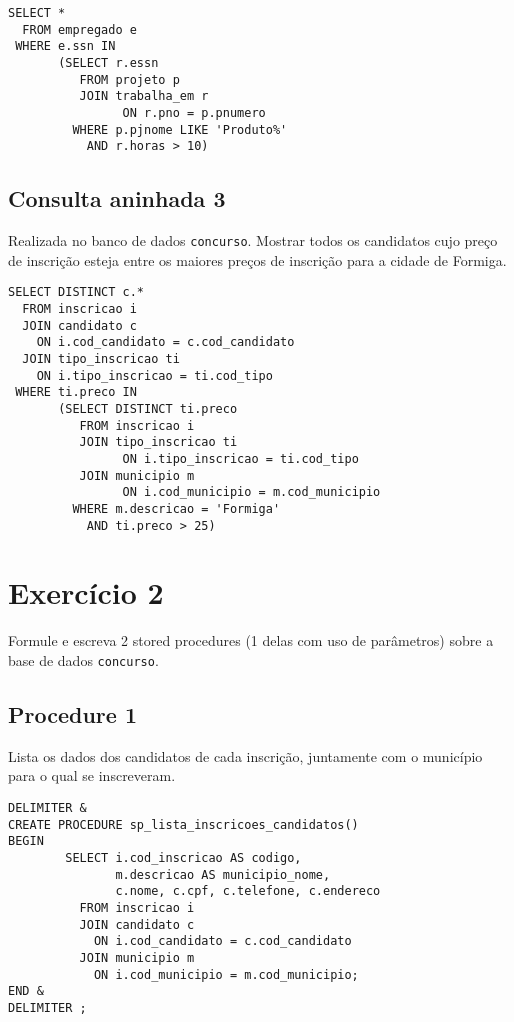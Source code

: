 \documentclass[article, a4paper, oneside, 11pt, english, brazil, sumario=tradicional]{abntex2}
\begin{document}
\begin{verbatim}
SELECT *
  FROM empregado e
 WHERE e.ssn IN
       (SELECT r.essn
          FROM projeto p
          JOIN trabalha_em r
                ON r.pno = p.pnumero
         WHERE p.pjnome LIKE 'Produto%'
           AND r.horas > 10)
\end{verbatim}

\subsection{Consulta aninhada 3}
\label{sec:org8d45d48}

Realizada no banco de dados \texttt{concurso}.
Mostrar todos  os candidatos  cujo preço  de inscrição  esteja entre  os maiores
preços de inscrição para a cidade de Formiga.

\begin{verbatim}
SELECT DISTINCT c.*
  FROM inscricao i
  JOIN candidato c
    ON i.cod_candidato = c.cod_candidato
  JOIN tipo_inscricao ti
    ON i.tipo_inscricao = ti.cod_tipo
 WHERE ti.preco IN
       (SELECT DISTINCT ti.preco
          FROM inscricao i
          JOIN tipo_inscricao ti
                ON i.tipo_inscricao = ti.cod_tipo
          JOIN municipio m
                ON i.cod_municipio = m.cod_municipio
         WHERE m.descricao = 'Formiga'
           AND ti.preco > 25)
\end{verbatim}

\section{Exercício 2}
\label{sec:orga85da9e}

Formule e escreva  2 stored procedures (1  delas com uso de  parâmetros) sobre a
base de dados \texttt{concurso}.

\subsection{Procedure 1}
\label{sec:org0bff792}

Lista os dados dos candidatos de cada inscrição, juntamente com o município para
o qual se inscreveram.

\begin{verbatim}
DELIMITER &
CREATE PROCEDURE sp_lista_inscricoes_candidatos()
BEGIN
        SELECT i.cod_inscricao AS codigo,
               m.descricao AS municipio_nome,
               c.nome, c.cpf, c.telefone, c.endereco
          FROM inscricao i
          JOIN candidato c
            ON i.cod_candidato = c.cod_candidato
          JOIN municipio m
            ON i.cod_municipio = m.cod_municipio;
END &
DELIMITER ;
\end{verbatim}
\end{document}
